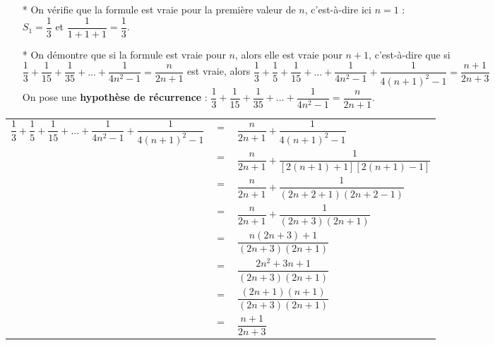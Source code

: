\begin{itemize}

\item[*] On vérifie que la formule est vraie pour la première valeur de $n$, c'est-à-dire ici $n = 1$ : \vspace{.3cm} \\ $S_1 = \dfrac{1}{3}$ et $\dfrac{1}{1+ 1 + 1} = \dfrac{1}{3}$. \\

\item[*] On démontre que si la formule est vraie pour $n$, alors elle est vraie pour $n+1$, c'est-à-dire que si \\ $\dfrac{1}{3} + \dfrac{1}{15} + \dfrac{1}{35} + ... + \dfrac{1}{4n^2 - 1} = \dfrac{n}{2n+1}$ est vraie, alors $ \dfrac{1}{3} + \dfrac{1}{5} + \dfrac{1}{15} + ... + \dfrac{1}{4n^2 - 1} + \dfrac{1}{4\left(n+1\right)^2 - 1} = \dfrac{n+1}{2n + 3}$ \vspace{.3cm} \\ On pose une \textbf{hypothèse de récurrence} : $\dfrac{1}{3} + \dfrac{1}{15} + \dfrac{1}{35} + ... + \dfrac{1}{4n^2 - 1} = \dfrac{n}{2n+1}$.
\end{itemize}

\vspace*{.3cm}

\begin{tabular}{lll}
$\dfrac{1}{3} + \dfrac{1}{5} + \dfrac{1}{15} + ... + \dfrac{1}{4n^2 - 1} + \dfrac{1}{4\left(n+1\right)^2 - 1}$ & $=$ & $\dfrac{n}{2n + 1} + \dfrac{1}{4\left(n+1\right)^2 - 1}$ \vspace*{.3cm} \\
& $=$ & $\dfrac{n}{2n +1} + \dfrac{1}{\left[2\left(n+1\right)+1\right]
\left[2\left(n+1\right)-1\right]}$ \vspace*{.3cm} \\
& $=$ & $\dfrac{n}{2n + 1} + \dfrac{1}{\left(2n + 2 + 1\right)\left(2n + 2 - 1\right)}$ \\
& $=$ & $\dfrac{n}{2n + 1} + \dfrac{1}{\left(2n + 3\right)\left(2n + 1\right)}$ \vspace*{.3cm} \\ 
& $=$ & $\dfrac{n\left(2n+3\right)+1}{\left(2n+3\right)\left(2n+1\right)}$ \vspace*{.3cm} \\
& $=$ & $\dfrac{2n^2 + 3n + 1}{\left(2n+3\right)\left(2n+1\right)}$ \vspace*{.3cm} \\
& $=$ & $\dfrac{\left(2n+1\right)\left(n+1\right)}{\left(2n+3\right)\left(2n+1\right)}$ \vspace*{.3cm} \\
& $=$ & $\dfrac{n+1}{2n+3}$ \\
\end{tabular}


\ifdefined\COMPLETE
\else
    
\fi
